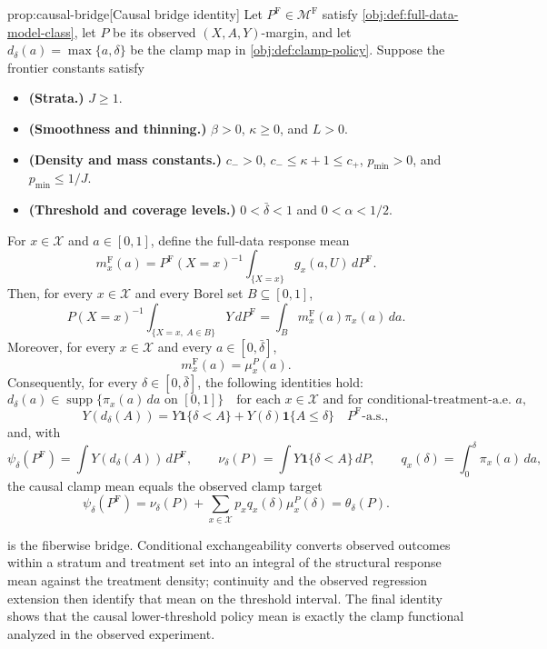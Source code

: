 \begin{propositionv}{prop:causal-bridge}[Causal bridge identity]
Let \(P^{\mathrm F}\in\mathcal M^{\mathrm F}\) satisfy \cref{obj:def:full-data-model-class}, let \(P\) be its observed \((X,A,Y)\)-margin, and let \(d_\delta(a)=\max\{a,\delta\}\) be the clamp map in \cref{obj:def:clamp-policy}.  Suppose the frontier constants satisfy
\begin{itemize}
\item \textbf{(Strata.)} \(J\geq 1\).
\item \textbf{(Smoothness and thinning.)} \(\beta>0\), \(\kappa\geq 0\), and \(L>0\).
\item \textbf{(Density and mass constants.)} \(c_->0\), \(c_-\leq \kappa+1\leq c_+\), \(p_{\min}>0\), and \(p_{\min}\leq 1/J\).
\item \textbf{(Threshold and coverage levels.)} \(0<\bar\delta<1\) and \(0<\alpha<1/2\).
\end{itemize}
For \(x\in\mathcal X\) and \(a\in[0,1]\), define the full-data response mean
\[
m_x^{\mathrm F}(a)
=
P^{\mathrm F}(X=x)^{-1}
\int_{\{X=x\}} g_x(a,U)\,dP^{\mathrm F}.
\]
Then, for every \(x\in\mathcal X\) and every Borel set \(B\subseteq[0,1]\),
\[
P(X=x)^{-1}
\int_{\{X=x,\ A\in B\}} Y\,dP^{\mathrm F}
=
\int_B m_x^{\mathrm F}(a)\pi_x(a)\,da.
\]
Moreover, for every \(x\in\mathcal X\) and every \(a\in[0,\bar\delta]\),
\[
m_x^{\mathrm F}(a)=\mu_x^P(a).
\]
Consequently, for every \(\delta\in[0,\bar\delta]\), the following identities hold:
\[
d_\delta(a)\in \operatorname{supp}\{\pi_x(a)\,da\text{ on }[0,1]\}
\quad
\text{for each }x\in\mathcal X\text{ and for conditional-treatment-a.e. }a,
\]
\[
Y(d_\delta(A))
=
Y\mathbf 1\{\delta<A\}+Y(\delta)\mathbf 1\{A\leq\delta\}
\quad P^{\mathrm F}\text{-a.s.},
\]
and, with
\[
\psi_\delta(P^{\mathrm F})=\int Y(d_\delta(A))\,dP^{\mathrm F},
\qquad
\nu_\delta(P)=\int Y\mathbf 1\{\delta<A\}\,dP,
\qquad
q_x(\delta)=\int_0^\delta \pi_x(a)\,da,
\]
the causal clamp mean equals the observed clamp target
\[
\psi_\delta(P^{\mathrm F})
=
\nu_\delta(P)+\sum_{x\in\mathcal X}p_xq_x(\delta)\mu_x^P(\delta)
=
\theta_\delta(P).
\]
\end{propositionv}

 is the fiberwise bridge. Conditional exchangeability converts observed outcomes within a stratum and treatment set into an integral of the structural response mean against the treatment density; continuity and the observed regression extension then identify that mean on the threshold interval. The final identity shows that the causal lower-threshold policy mean is exactly the clamp functional analyzed in the observed experiment.

